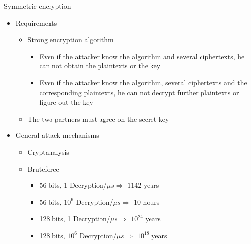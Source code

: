 \documentclass{beamer}
\begin{document}
\begin{frame}{Symmetric encryption}
  \begin{itemize}
  \item Requirements
    \begin{itemize}
  \item Strong encryption algorithm
    \begin{itemize}
      \item Even if the attacker know the algorithm and several
        ciphertexts, he can not obtain the plaintexts or the key
      \item Even if the attacker know the algorithm, several
        ciphertexts and the corresponding plaintexts,
        he can not decrypt further plaintexts or figure out the key
    \end{itemize}
  \item The two partners must agree on the secret key
    \end{itemize}
  \item<2-> General attack mechanisms
    \begin{itemize}
      \item Cryptanalysis
      \item Bruteforce
        \begin{itemize}
          \item <3->56 bits, 1 Decryption/$\mu s \Rightarrow$ $1142$ years
          \item <3->56 bits, $10^6$ Decryption/$\mu s \Rightarrow$
            $10$ hours
          \item <3->128 bits, 1 Decryption/$\mu s \Rightarrow$ $10^{24}$ years
          \item <3->128 bits, $10^6$ Decryption/$\mu s \Rightarrow$
            $10^{18}$ years
        \end{itemize}
    \end{itemize}
  \end{itemize}
\end{frame}
\end{document}
